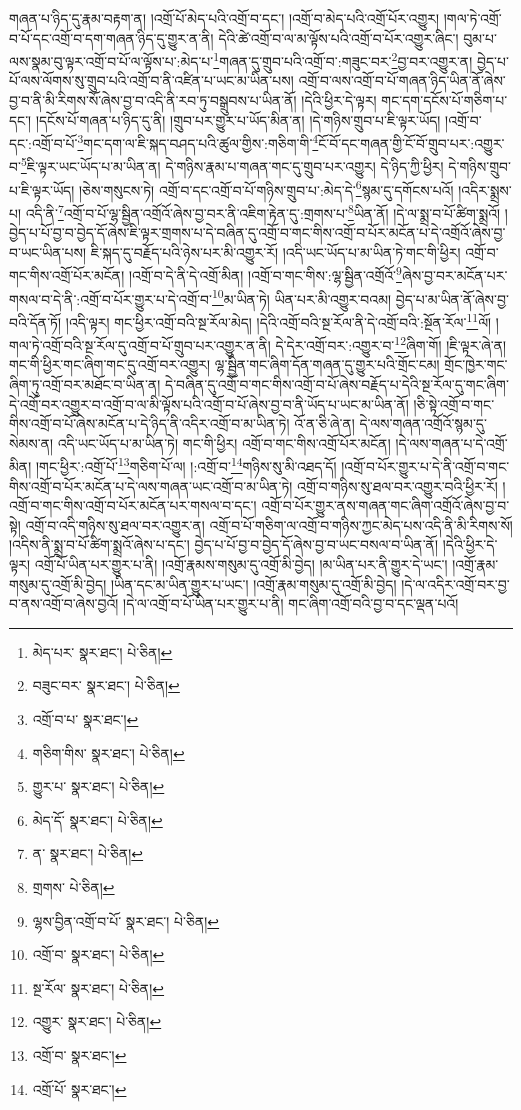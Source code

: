 གཞན་པ་ཉིད་དུ་རྣམ་བརྟག་ན། །འགྲོ་པོ་མེད་པའི་འགྲོ་བ་དང་། །འགྲོ་བ་མེད་པའི་འགྲོ་པོར་འགྱུར། །གལ་ཏེ་འགྲོ་བ་པོ་དང་འགྲོ་བ་དག་གཞན་ཉིད་དུ་གྱུར་ན་ནི། དེའི་ཚེ་འགྲོ་བ་ལ་མ་ལྟོས་པའི་འགྲོ་བ་པོར་འགྱུར་ཞིང་། བུམ་པ་ལས་སྣམ་བུ་ལྟར་འགྲོ་བ་པོ་ལ་ལྟོས་པ་:མེད་པ་\footnote{མེད་པར་  སྣར་ཐང་།  པེ་ཅིན། }གཞན་དུ་གྲུབ་པའི་འགྲོ་བ་:གཟུང་བར་\footnote{བཟུང་བར་  སྣར་ཐང་།  པེ་ཅིན། }བྱ་བར་འགྱུར་ན། བྱེད་པ་པོ་ལས་ལོགས་སུ་གྲུབ་པའི་འགྲོ་བ་ནི་འཛིན་པ་ཡང་མ་ཡིན་པས། འགྲོ་བ་ལས་འགྲོ་བ་པོ་གཞན་ཉིད་ཡིན་ནོ་ཞེས་བྱ་བ་ནི་མི་རིགས་སོ་ཞེས་བྱ་བ་འདི་ནི་རབ་ཏུ་བསྒྲུབས་པ་ཡིན་ནོ། །དེའི་ཕྱིར་དེ་ལྟར། གང་དག་དངོས་པོ་གཅིག་པ་དང་། །དངོས་པོ་གཞན་པ་ཉིད་དུ་ནི། །གྲུབ་པར་གྱུར་པ་ཡོད་མིན་ན། །དེ་གཉིས་གྲུབ་པ་ཇི་ལྟར་ཡོད། །འགྲོ་བ་དང་:འགྲོ་བ་པོ་\footnote{འགྲོ་བ་པ་  སྣར་ཐང་། }གང་དག་ལ་ཇི་སྐད་བཤད་པའི་ཚུལ་གྱིས་:གཅིག་གི་\footnote{གཅིག་གིས་  སྣར་ཐང་།  པེ་ཅིན། }ངོ་བོ་དང་གཞན་གྱི་ངོ་བོ་གྲུབ་པར་:འགྱུར་བ་\footnote{གྱུར་པ་  སྣར་ཐང་།  པེ་ཅིན། }ཇི་ལྟར་ཡང་ཡོད་པ་མ་ཡིན་ན། དེ་གཉིས་རྣམ་པ་གཞན་གང་དུ་གྲུབ་པར་འགྱུར། དེ་ཉིད་ཀྱི་ཕྱིར། དེ་གཉིས་གྲུབ་པ་ཇི་ལྟར་ཡོད། །ཅེས་གསུངས་ཏེ། འགྲོ་བ་དང་འགྲོ་བ་པོ་གཉིས་གྲུབ་པ་:མེད་དེ་\footnote{མེད་དོ་  སྣར་ཐང་།  པེ་ཅིན། }སྙམ་དུ་དགོངས་པའོ། །འདིར་སྨྲས་པ། འདི་ནི་\footnote{ན་  སྣར་ཐང་།  པེ་ཅིན། }འགྲོ་བ་པོ་ལྷ་སྦྱིན་འགྲོའོ་ཞེས་བྱ་བར་ནི་འཇིག་རྟེན་དུ་:གྲགས་པ་\footnote{གྲགས་  པེ་ཅིན། }ཡིན་ནོ། །དེ་ལ་སྨྲ་བ་པོ་ཚིག་སྨྲའོ། །བྱེད་པ་པོ་བྱ་བ་བྱེད་དོ་ཞེས་ཇི་ལྟར་གྲགས་པ་དེ་བཞིན་དུ་འགྲོ་བ་གང་གིས་འགྲོ་བ་པོར་མངོན་པ་དེ་འགྲོའོ་ཞེས་བྱ་བ་ཡང་ཡིན་པས། ཇི་སྐད་དུ་བརྗོད་པའི་ཉེས་པར་མི་འགྱུར་རོ། །འདི་ཡང་ཡོད་པ་མ་ཡིན་ཏེ་གང་གི་ཕྱིར། འགྲོ་བ་གང་གིས་འགྲོ་པོར་མངོན། །འགྲོ་བ་དེ་ནི་དེ་འགྲོ་མིན། །འགྲོ་བ་གང་གིས་:ལྷ་སྦྱིན་འགྲོའོ་\footnote{ལྷས་བྱིན་འགྲོ་བ་པོ་  སྣར་ཐང་།  པེ་ཅིན། }ཞེས་བྱ་བར་མངོན་པར་གསལ་བ་དེ་ནི་:འགྲོ་བ་པོར་གྱུར་པ་དེ་འགྲོ་བ་\footnote{འགྲོ་བ་  སྣར་ཐང་།  པེ་ཅིན། }མ་ཡིན་ཏེ། ཡིན་པར་མི་འགྱུར་བའམ། བྱེད་པ་མ་ཡིན་ནོ་ཞེས་བྱ་བའི་དོན་ཏོ། །འདི་ལྟར། གང་ཕྱིར་འགྲོ་བའི་སྔ་རོལ་མེད། །དེའི་འགྲོ་བའི་སྔ་རོལ་ནི་དེ་འགྲོ་བའི་:སྔོན་རོལ་\footnote{སྔ་རོལ་  སྣར་ཐང་།  པེ་ཅིན། }ལོ། །གལ་ཏེ་འགྲོ་བའི་སྔ་རོལ་དུ་འགྲོ་བ་པོ་གྲུབ་པར་འགྱུར་ན་ནི། དེ་དེར་འགྲོ་བར་:འགྱུར་བ་\footnote{འགྱུར་  སྣར་ཐང་།  པེ་ཅིན། }ཞིག་གོ། །ཇི་ལྟར་ཞེ་ན། གང་གི་ཕྱིར་གང་ཞིག་གང་དུ་འགྲོ་བར་འགྱུར། ལྷ་སྦྱིན་གང་ཞིག་དོན་གཞན་དུ་གྱུར་པའི་གྲོང་ངམ། གྲོང་ཁྱེར་གང་ཞིག་ཏུ་འགྲོ་བར་མཐོང་བ་ཡིན་ན། དེ་བཞིན་དུ་འགྲོ་བ་གང་གིས་འགྲོ་བ་པོ་ཞེས་བརྗོད་པ་དེའི་སྔ་རོལ་དུ་གང་ཞིག་དེ་འགྲོ་བར་འགྱུར་བ་འགྲོ་བ་ལ་མི་ལྟོས་པའི་འགྲོ་བ་པོ་ཞེས་བྱ་བ་ནི་ཡོད་པ་ཡང་མ་ཡིན་ནོ། །ཅི་སྟེ་འགྲོ་བ་གང་གིས་འགྲོ་བ་པོ་ཞེས་མངོན་པ་དེ་ཉིད་ནི་འདིར་འགྲོ་བ་མ་ཡིན་ཏེ། འོ་ན་ཅི་ཞེ་ན། དེ་ལས་གཞན་འགྲོའོ་སྙམ་དུ་སེམས་ན། འདི་ཡང་ཡོད་པ་མ་ཡིན་ཏེ། གང་གི་ཕྱིར། འགྲོ་བ་གང་གིས་འགྲོ་པོར་མངོན། །དེ་ལས་གཞན་པ་དེ་འགྲོ་མིན། །གང་ཕྱིར་:འགྲོ་པོ་\footnote{འགྲོ་བ་  སྣར་ཐང་། }གཅིག་པོ་ལ། །:འགྲོ་བ་\footnote{འགྲོ་པོ་  སྣར་ཐང་། }གཉིས་སུ་མི་འཐད་དོ། །འགྲོ་བ་པོར་གྱུར་པ་དེ་ནི་འགྲོ་བ་གང་གིས་འགྲོ་བ་པོར་མངོན་པ་དེ་ལས་གཞན་ཡང་འགྲོ་བ་མ་ཡིན་ཏེ། འགྲོ་བ་གཉིས་སུ་ཐལ་བར་འགྱུར་བའི་ཕྱིར་རོ། །འགྲོ་བ་གང་གིས་འགྲོ་བ་པོར་མངོན་པར་གསལ་བ་དང་། འགྲོ་བ་པོར་གྱུར་ནས་གཞན་གང་ཞིག་འགྲོའོ་ཞེས་བྱ་བ་སྟེ། འགྲོ་བ་འདི་གཉིས་སུ་ཐལ་བར་འགྱུར་ན། འགྲོ་བ་པོ་གཅིག་ལ་འགྲོ་བ་གཉིས་ཀྱང་མེད་པས་འདི་ནི་མི་རིགས་སོ། །འདིས་ནི་སྨྲ་བ་པོ་ཚིག་སྨྲའོ་ཞེས་པ་དང་། བྱེད་པ་པོ་བྱ་བ་བྱེད་དོ་ཞེས་བྱ་བ་ཡང་བསལ་བ་ཡིན་ནོ། །དེའི་ཕྱིར་དེ་ལྟར། འགྲོ་པོ་ཡིན་པར་གྱུར་པ་ནི། །འགྲོ་རྣམས་གསུམ་དུ་འགྲོ་མི་བྱེད། །མ་ཡིན་པར་ནི་གྱུར་དེ་ཡང་། །འགྲོ་རྣམ་གསུམ་དུ་འགྲོ་མི་བྱེད། །ཡིན་དང་མ་ཡིན་གྱུར་པ་ཡང་། །འགྲོ་རྣམ་གསུམ་དུ་འགྲོ་མི་བྱེད། །དེ་ལ་འདིར་འགྲོ་བར་བྱ་བ་ནས་འགྲོ་བ་ཞེས་བྱའོ། །དེ་ལ་འགྲོ་བ་པོ་ཡིན་པར་གྱུར་པ་ནི། གང་ཞིག་འགྲོ་བའི་བྱ་བ་དང་ལྡན་པའོ། 